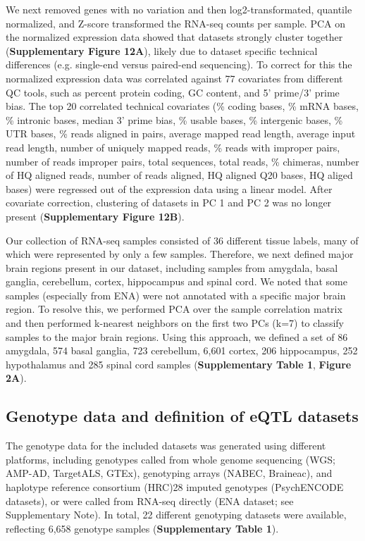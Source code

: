 We next removed genes with no variation and then log2-transformated, quantile normalized, and Z-score transformed the RNA-seq counts per sample. PCA on the normalized expression data showed that datasets strongly cluster together (\textbf{Supplementary Figure 12A}), likely due to dataset specific technical differences (e.g. single-end versus paired-end sequencing). To correct for this the normalized expression data was correlated against 77 covariates from different QC tools, such as percent protein coding, GC content, and 5’ prime/3’ prime bias. The top 20 correlated technical covariates (\% coding bases, \% mRNA bases, \% intronic bases, median 3’ prime bias, \% usable bases, \% intergenic bases, \% UTR bases, \% reads aligned in pairs, average mapped read length, average input read length, number of uniquely mapped reads, \% reads with improper pairs, number of reads improper pairs, total sequences, total reads, \% chimeras, number of HQ aligned reads, number of reads aligned, HQ aligned Q20 bases, HQ aliged bases) were regressed out of the expression data using a linear model. After covariate correction, clustering of datasets in PC 1 and PC 2 was no longer present (\textbf{Supplementary Figure 12B}).  

Our collection of RNA-seq samples consisted of 36 different tissue labels, many of which were represented by only a few samples. Therefore, we next defined major brain regions present in our dataset, including samples from amygdala, basal ganglia, cerebellum, cortex, hippocampus and spinal cord. We noted that some samples (especially from ENA) were not annotated with a specific major brain region. To resolve this, we performed PCA over the sample correlation matrix and then performed k-nearest neighbors on the first two PCs (k=7) to classify samples to the major brain regions. Using this approach, we defined a set of 86 amygdala, 574 basal ganglia, 723 cerebellum, 6,601 cortex, 206 hippocampus, 252 hypothalamus and 285 spinal cord samples (\textbf{Supplementary Table 1}, \textbf{Figure 2A}). 



\subsection{Genotype data and definition of eQTL datasets}
The genotype data for the included datasets was generated using different platforms, including genotypes called from whole genome sequencing (WGS; AMP-AD, TargetALS, GTEx\cite{consortiumGTExConsortiumAtlas2020}), genotyping arrays (NABEC, Braineac\cite{ramasamyGeneticVariabilityRegulation2014}), and haplotype reference consortium (HRC)28 imputed genotypes (PsychENCODE datasets), or were called from RNA-seq directly (ENA dataset; see Supplementary Note). In total, 22 different genotyping datasets were available, reflecting 6,658 genotype samples (\textbf{Supplementary Table 1}).  

